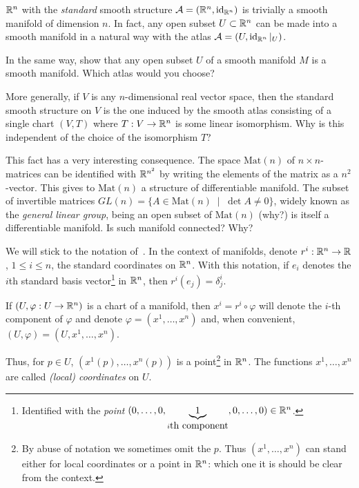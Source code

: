 \begin{exercise}\label{exe:subsetsmanifolds}
  $\mathbb{R}^n$ with the \emph{standard} smooth structure $\mathcal{A}=(\mathbb{R}^n, \operatorname{id}_{\mathbb{R}^n})$ is trivially a smooth manifold of dimension $n$.
  In fact, any open subset $U\subset\mathbb{R}^n$ can be made into a smooth manifold in a natural way with the atlas $\mathcal{A}=(U, \operatorname{id}_{\mathbb{R}^n}|_U)$.

  In the same way, show that any open subset $U$ of a smooth manifold $M$ is a smooth manifold.
  Which atlas would you choose?

  More generally, if $V$ is any $n$-dimensional real vector space, then the standard smooth structure on $V$ is the one induced by the smooth atlas consisting of a single chart $(V, T)$ where $T: V \to \mathbb{R}^n$ is some linear isomorphism.
  Why is this independent of the choice of the isomorphism $T$?

  This fact has a very interesting consequence.
  The space $\mathrm{Mat}(n)$ of $n\times n$-matrices can be identified with $\mathbb{R}^{n^2}$ by writing the elements of the matrix as a $n^2$-vector.
  This gives to $\mathrm{Mat}(n)$ a structure of differentiable manifold.
  The subset of invertible matrices $GL(n) = \{ A \in \mathrm{Mat}(n) \;\mid\; \det A \neq 0\}$, widely known as the \emph{general linear group}, being an open subset of $\mathrm{Mat}(n)$ (why?) is itself a differentiable manifold.
  Is such manifold connected? Why?
\end{exercise}

\vspace{1em}
\begin{notation}\label{ntn:coords}
  We will stick to the notation of~\cite{book:tu}.
  In the context of manifolds, denote $r^i: \mathbb{R}^n\to\mathbb{R}$, $1\leq i\leq n$, the standard coordinates on $\mathbb{R}^n$.
  With this notation, if $e_i$ denotes the $i$th standard basis vector\footnote{Identified with the \emph{point} $(0,\ldots,0,\LaTeXunderbrace{1}_{i\mbox{th component}},0,\ldots,0) \in\R^n$.} in $\mathbb{R}^n$, then $r^i(e_j) = \delta^i_j$.

  If $(U, \varphi:U\to\mathbb{R}^n)$ is a chart of a manifold, then $x^i = r^i\circ\varphi$ will denote the $i$-th component of $\varphi$ and denote $\varphi = (x^1, \ldots, x^n)$ and, when convenient, $(U,\varphi) = (U, x^1, \ldots, x^n)$.

  Thus, for $p\in U$, $(x^1(p), \ldots, x^n(p))$ is a point\footnote{By abuse of notation we sometimes omit the $p$. 
  Thus $(x^1, \ldots, x^n)$ can stand either for local coordinates or a point in $\mathbb{R}^n$: which one it is should be clear from the context.} in $\mathbb{R}^n$.
  The functions $x^1, \ldots, x^n$  are called \emph{(local) coordinates} on $U$.
\end{notation}
\vspace{1em}

